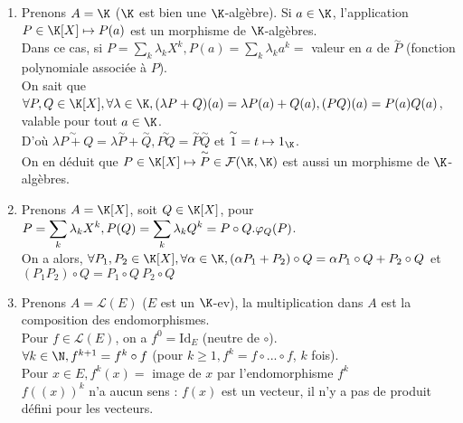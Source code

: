 \documentclass[12pt, a4paper]{report}
\begin{document}
\begin{exemple}[Exemples]{}
\begin{enumerate}
	\item Prenons $A = \K$ ($\K$ est bien une $\K$-algèbre). Si $a \in \K$, l'application $P \in \K[X] \mapsto P(a)$ est un morphisme de $\K$-algèbres. \\
	Dans ce cas, si $P = \displaystyle{\sum_k \lambda_k X^k}, P(a) = \displaystyle{\sum_k \lambda_k a^k} =$ valeur en $a$ de $\overset{\sim}{P}$ (fonction polynomiale associée à $P$). \\
	
	On sait que $\forall P,Q \in \K[X], \forall  \lambda \in \K, (\lambda P + Q)(a) = \lambda P(a) + Q(a), (PQ)(a) = P(a)Q(a)$, valable pour tout $a \in \K$. \\
	D'où $\overset{\sim}{\lambda P + Q} = \lambda \overset{\sim}{P}+\overset{\sim}{Q}, \overset{\sim}{PQ} = \overset{\sim}{P} \overset{\sim}{Q}$ et $\overset{\sim}{1} = t \mapsto 1_\K$. \\
	On en déduit que $P \in \K[X] \mapsto \overset{\sim}{P} \in \mathcal{F}(\K,\K)$ est aussi un morphisme de $\K$-algèbres. \\
	
	\item Prenons $A = \K[X]$, soit $Q \in \K[X]$, pour $P = \displaystyle{\sum_k \lambda_k X^k}, \\
	P(Q) = \displaystyle{\sum_k \lambda_k Q^k} = P \circ Q. \varphi_Q(P)$. \\
	On a alors, $\forall P_1,P_2 \in \K[X], \\
	\forall \alpha \in \K, (\alpha P_1 + P_2) \circ Q = \alpha P_1 \circ Q + P_2 \circ Q$ et $(P_1P_2) \circ Q = P_1 \circ Q \: P_2 \circ Q$ \\
	
	\item Prenons $A = \mathcal{L}(E)$ ($E$ est un $\K$-ev), la multiplication dans $A$ est la composition des endomorphismes. \\
	Pour $f \in \mathcal{L}(E)$, on a $f^0 = \text{Id}_E$ (neutre de $\circ$). \\
	$\forall k \in \N, f^{k+1} = f^k \circ f$ (pour $k \ge 1, f^k = f \circ ... \circ f$, $k$ fois). \\
	Pour $x \in E, f^k(x) =$ image de $x$ par l'endomorphisme $f^k$ \\
	$f((x))^k$ n'a aucun sens : $f(x)$ est un vecteur, il n'y a pas de produit défini pour les vecteurs. \\
	

\end{enumerate}
\end{exemple}
\end{document}
